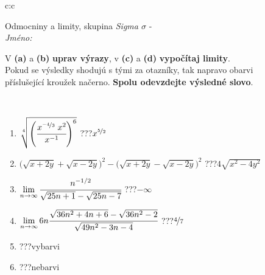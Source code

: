 \documentclass[10pt]{report}
\begin{document}
\newpage
\thispagestyle{empty}
\begin{tabular}{c:c}
\begin{minipage}[c][104.5mm][t]{0.5\linewidth}
\begin{center}
\vspace{7mm}
{\huge Odmocniny a limity, skupina \textit{Sigma $\sigma$} -}\\[5mm]
\textit{Jméno:}\phantom{xxxxxxxxxxxxxxxxxxxxxxxxxxxxxxxxxxxxxxxxxxxxxxxxxxxxxxxxxxxxxxxxx}\\[5mm]
\begin{minipage}{0.95\linewidth}
\begin{center}
V \textbf{(a)} a \textbf{(b)} \textbf{uprav výrazy}, v \textbf{(c)} a \textbf{(d)} \textbf{vypočítaj limity}.\\Pokud se výsledky shodujú s tými za otazníky, tak napravo obarvi\\příslušející kroužek načerno. \textbf{Spolu odevzdejte výsledné slovo}.
\end{center}
\end{minipage}
\\[1mm]
\begin{minipage}{0.79\linewidth}
\begin{center}
\begin{varwidth}{\linewidth}
\begin{enumerate}
\small
\item $\sqrt[4]{\left(\cfrac{x^{\nicefrac{-4}{3}}\;x^{2}}{x^{-1}}\right)^{6}}$\quad \dotfill\; ???\;\dotfill \quad $x^{\nicefrac{5}{2}}$
\item {\footnotesize{\scriptsize$\big(\sqrt{x+2y}+\sqrt{x-2y}\big)^2-\big(\sqrt{x+2y}-\sqrt{x-2y}\big)^2$}\quad \dotfill\; ???\;\dotfill \quad $4\sqrt{x^2-4y^2}$}
\item $\lim\limits_{n\to\infty}\cfrac{n^{-1/2}}{\sqrt{25n+1}-\sqrt{25n-7}}$\quad \dotfill\; ???\;\dotfill \quad $-\infty$
\item $\lim\limits_{n\to\infty}6n\cfrac{\sqrt{36n^2+4n+6}-\sqrt{36n^2-2}}{\sqrt{49n^2-3n-4}}$\quad \dotfill\; ???\;\dotfill \quad $\nicefrac{4}{7}$
\item \quad \dotfill\; ???\;\dotfill \quad vybarvi
\item \quad \dotfill\; ???\;\dotfill \quad nebarvi
\end{enumerate}
\end{varwidth}
\end{center}
\end{minipage}
\begin{minipage}{0.20\linewidth}

\end{minipage}
\end{center}
\end{minipage}
\end{tabular}
\end{document}
